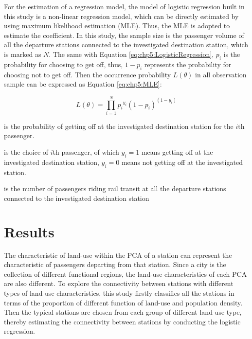%
For the estimation of a regression model, the model of logistic regression built in this study is a non-linear regression model, which can be directly estimated by using maximum likelihood estimation (MLE). Thus, the MLE is adopted to estimate the coefficient. In this study, the sample size is the passenger volume of all the departure stations connected to the investigated destination station, which is marked as $N$. The same with Equation \ref{eq:chp5:LogisticRegression}, $p_i$ is the probability for choosing to get off, thus, $1-p_i$ represents the probability for choosing not to get off. Then the occurrence probability $L(\theta)$ in all observation sample can be expressed as Equation \ref{eq:chp5:MLE}:

\begin{equation}
	L(\theta)=\prod_{i=1}^{N}{p_i}^{y_i}(1-p_i)^{(1-y_i)}
	\label{eq:chp5:MLE}
\end{equation}

\begin{description}
	\setlength{\parskip}{0\baselineskip} %
	\normalsize
	\item[\textbf{Where:}]
	\item[$p_i$] is the probability of getting off at the investigated destination station for the $i$th passenger.
	\item[$y_i$] is the choice of $i$th passenger, of which $y_i = 1$ means getting off at the investigated destination station, $y_i = 0$ means not getting off at the investigated station.
	\item[$N$] is the number of passengers riding rail transit at all the departure stations connected to the investigated destination station
	\setlength{\parskip}{0.7\baselineskip} %
\end{description}

\section{Results}
%
The characteristic of land-use within the PCA of a station can represent the characteristic of passengers departing from that station. Since a city is the collection of different functional regions, the land-use characteristics of each PCA are also different. To explore the connectivity between stations with different types of land-use characteristics, this study firstly classifies all the stations in terms of the proportion of different function of land-use and population density. Then the typical stations are chosen from each group of different land-use type, thereby estimating the connectivity between stations by conducting the logistic regression. 

